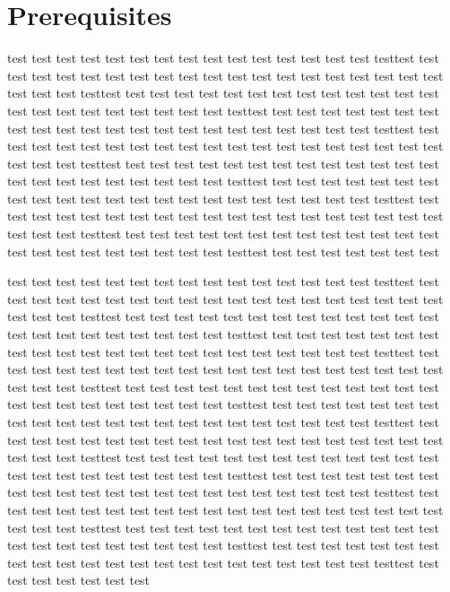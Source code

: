 % 
% 

\chapter{Prerequisites}

test test test test test test test test test test test test test test test testtest test test test test test test test
test test test test test test test test test test test test test test test testtest test test test test test test test
test test test test test test test test test test test test test test test testtest test test test test test test test
test test test test test test test test test test test test test test test testtest test test test test test test test
test test test test test test test test test test test test test test test testtest test test test test test test test
test test test test test test test test test test test test test test test testtest test test test test test test test
test test test test test test test test test test test test test test test testtest test test test test test test test
test test test test test test test test test test test test test test test testtest test test test test test test test
test test test test test test test test test test test test test test test testtest test test test test test test test


test test test test test test test test test test test test test test test testtest test test test test test test test
test test test test test test test test test test test test test test test testtest test test test test test test test
test test test test test test test test test test test test test test test testtest test test test test test test test
test test test test test test test test test test test test test test test testtest test test test test test test test
test test test test test test test test test test test test test test test testtest test test test test test test test
test test test test test test test test test test test test test test test testtest test test test test test test test
test test test test test test test test test test test test test test test testtest test test test test test test test
test test test test test test test test test test test test test test test testtest test test test test test test test
test test test test test test test test test test test test test test test testtest test test test test test test test
test test test test test test test test test test test test test test test testtest test test test test test test test
test test test test test test test test test test test test test test test testtest test test test test test test test
test test test test test test test test test test test test test test test testtest test test test test test test test
test test test test test test test test test test test test test test test testtest test test test test test test test




